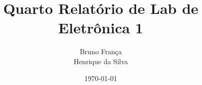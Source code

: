 \documentclass[12pt,twoside, a4paper]{article}
\begin{document}
\title{Quarto Relatório de Lab de Eletrônica 1}
\author{Bruno França \\ Henrique da Silva}
\date{\today}

\maketitle
{}
\tableofcontents
\newpage















% 
\end{document}
